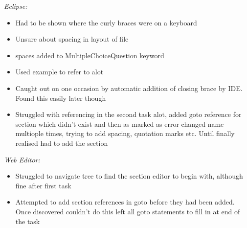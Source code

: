 \emph{Eclipse:}
\begin{itemize}
\item Had to be shown where the curly braces were on a keyboard
\item Unsure about spacing in layout of file
\item spaces added to MultipleChoiceQuestion keyword
\item Used example to refer to alot
\item Caught out on one occasion by automatic addition of closing brace by IDE. Found this easily later though
\item Struggled with referencing in the second task alot, added goto reference for section which didn't exist and then as marked as error changed name multiople times, trying to add spacing, quotation marks etc. Until finally realised had to add the section
\end{itemize}
\emph{Web Editor:}
\begin{itemize}
\item Struggled to navigate tree to find the section editor to begin with, although fine after first task
\item Attempted to add section references in goto before they had been added. Once discovered couldn't do this left all goto statements to fill in at end of the task
\end{itemize}

